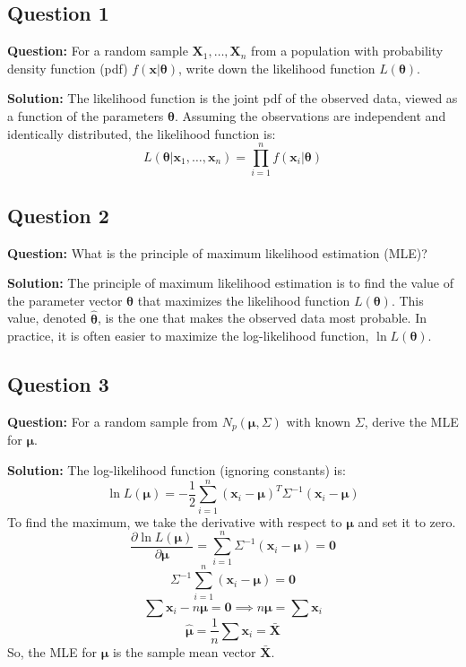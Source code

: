 \subsection*{Question 1}
\textbf{Question:} For a random sample $\mathbf{X}_1, \dots, \mathbf{X}_n$ from a population with probability density function (pdf) $f(\mathbf{x} | \boldsymbol{\theta})$, write down the likelihood function $L(\boldsymbol{\theta})$.

\textbf{Solution:}
The likelihood function is the joint pdf of the observed data, viewed as a function of the parameters $\boldsymbol{\theta}$. Assuming the observations are independent and identically distributed, the likelihood function is:
$$ L(\boldsymbol{\theta} | \mathbf{x}_1, \dots, \mathbf{x}_n) = \prod_{i=1}^n f(\mathbf{x}_i | \boldsymbol{\theta}) $$

\subsection*{Question 2}
\textbf{Question:} What is the principle of maximum likelihood estimation (MLE)?

\textbf{Solution:}
The principle of maximum likelihood estimation is to find the value of the parameter vector $\boldsymbol{\theta}$ that maximizes the likelihood function $L(\boldsymbol{\theta})$. This value, denoted $\hat{\boldsymbol{\theta}}$, is the one that makes the observed data most probable. In practice, it is often easier to maximize the log-likelihood function, $\ln L(\boldsymbol{\theta})$.

\subsection*{Question 3}
\textbf{Question:} For a random sample from $N_p(\boldsymbol{\mu}, \Sigma)$ with known $\Sigma$, derive the MLE for $\boldsymbol{\mu}$.

\textbf{Solution:}
The log-likelihood function (ignoring constants) is:
$$ \ln L(\boldsymbol{\mu}) = -\frac{1}{2} \sum_{i=1}^n (\mathbf{x}_i - \boldsymbol{\mu})^T \Sigma^{-1} (\mathbf{x}_i - \boldsymbol{\mu}) $$
To find the maximum, we take the derivative with respect to $\boldsymbol{\mu}$ and set it to zero.
$$ \frac{\partial \ln L(\boldsymbol{\mu})}{\partial \boldsymbol{\mu}} = \sum_{i=1}^n \Sigma^{-1}(\mathbf{x}_i - \boldsymbol{\mu}) = \mathbf{0} $$
$$ \Sigma^{-1} \sum_{i=1}^n (\mathbf{x}_i - \boldsymbol{\mu}) = \mathbf{0} $$
$$ \sum \mathbf{x}_i - n\boldsymbol{\mu} = \mathbf{0} \implies n\boldsymbol{\mu} = \sum \mathbf{x}_i $$
$$ \hat{\boldsymbol{\mu}} = \frac{1}{n} \sum \mathbf{x}_i = \bar{\mathbf{X}} $$
So, the MLE for $\boldsymbol{\mu}$ is the sample mean vector $\bar{\mathbf{X}}$.

